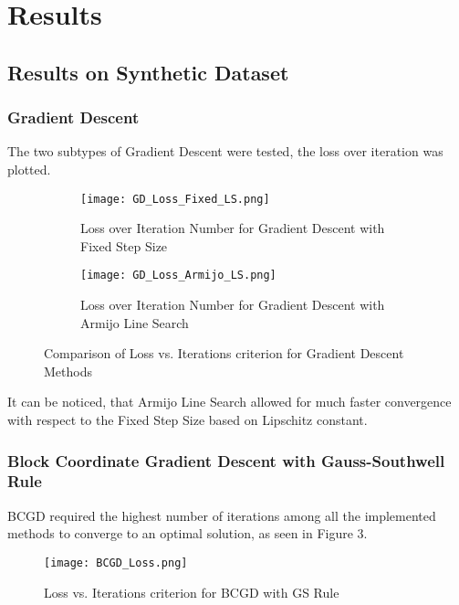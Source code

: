 \documentclass{article}
\begin{document}
\newpage
\section{Results}
\subsection{Results on Synthetic Dataset}
\subsubsection{Gradient Descent}
The two subtypes of Gradient Descent were tested, the loss over iteration was plotted. 
\begin{figure}[h]
    \centering
    \begin{subfigure}{0.45\textwidth}  %
        \texttt{[image: GD\_Loss\_Fixed\_LS.png]}  %
        \caption{Loss over Iteration Number for Gradient Descent with Fixed Step Size}
        \label{fig:image1}
    \end{subfigure}
    \hfill
    \begin{subfigure}{0.45\textwidth}  %
        \texttt{[image: GD\_Loss\_Armijo\_LS.png]}  %
        \caption{Loss over Iteration Number for Gradient Descent with Armijo Line Search}
        \label{fig:image2}
    \end{subfigure}
    \caption{Comparison of Loss vs. Iterations criterion for Gradient Descent Methods}
    \label{fig:side_by_side}
\end{figure}

\noindent It can be noticed, that Armijo Line Search allowed for much faster convergence with respect to the Fixed Step Size based on Lipschitz constant.

\subsubsection{Block Coordinate Gradient Descent with Gauss-Southwell Rule}

BCGD required the highest number of iterations among all the implemented methods to converge to an optimal solution, as seen in Figure 3.

\begin{figure}[h]
    \centering
    \texttt{[image: BCGD\_Loss.png]}
    \caption{Loss vs. Iterations criterion for BCGD with GS Rule}
    \label{fig:my_image}
\end{figure}
\end{document}
